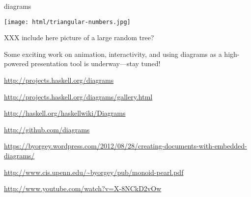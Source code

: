 \begin{hcarentry}[updated]{diagrams}
\begin{center}
\texttt{[image: html/triangular-numbers.jpg]}
\end{center}

XXX include here picture of a large random tree?

\FuturePlans

Some exciting work on animation, interactivity, and using diagrams as
a high-powered presentation tool is underway---stay tuned!


\FurtherReading
\begin{compactitem}
\item \url{http://projects.haskell.org/diagrams}
\item \url{http://projects.haskell.org/diagrams/gallery.html}
\item \url{http://haskell.org/haskellwiki/Diagrams}
\item \url{http://github.com/diagrams}
\item
  \url{https://byorgey.wordpress.com/2012/08/28/creating-documents-with-embedded-diagrams/}
\item \url{http://www.cis.upenn.edu/~byorgey/pub/monoid-pearl.pdf}
\item \url{http://www.youtube.com/watch?v=X-8NCkD2vOw}
\end{compactitem}
\end{hcarentry}
